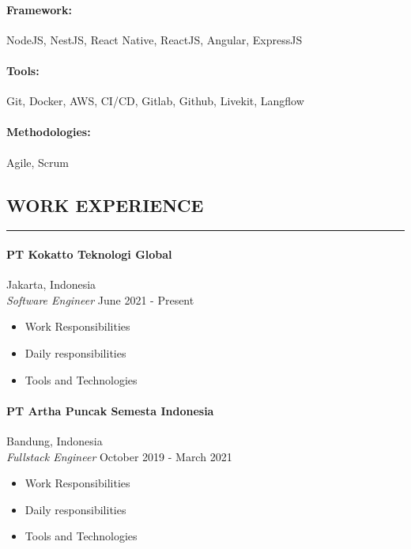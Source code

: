 \documentclass{article}
\begin{document}
\paragraph{Framework:} NodeJS, NestJS, React Native, ReactJS, Angular, ExpressJS
\vspace{-1.4em}
\paragraph{Tools:} Git, Docker, AWS, CI/CD, Gitlab, Github, Livekit, Langflow
\vspace{-1.4em}
\paragraph{Methodologies:} Agile, Scrum

\subsection*{WORK EXPERIENCE}
\vspace{-0.1em}
\hrule
\vspace{0.4em}
\paragraph{PT Kokatto Teknologi Global} \hfill Jakarta, Indonesia \\
{\it Software Engineer} \hfill June 2021 - Present
\vspace{-0.5em}
\begin{itemize}
    \setlength{\itemsep}{-0.3em}
    \item Work Responsibilities
    \item Daily responsibilities
    \item Tools and Technologies
\end{itemize}
\vspace{-2em}
\paragraph{PT Artha Puncak Semesta Indonesia} \hfill Bandung, Indonesia \\
{\it Fullstack Engineer} \hfill October 2019 - March 2021
\vspace{-0.5em}
\begin{itemize}
    \setlength{\itemsep}{-0.3em}
    \item Work Responsibilities
    \item Daily responsibilities
    \item Tools and Technologies
\end{itemize}
\vspace{-2em}
\end{document}
